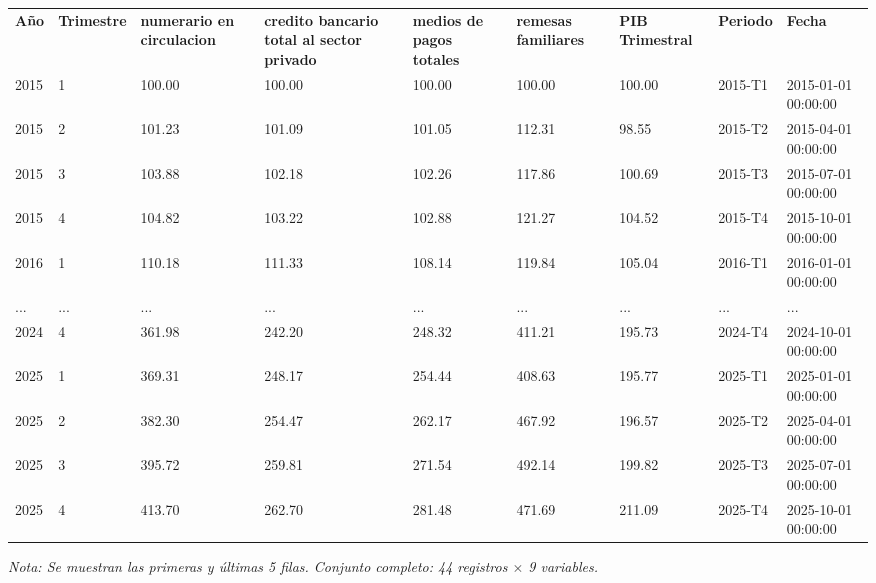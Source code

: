 

\begin{table}[htbp]

\centering

\begin{adjustbox}{max width=\textwidth}

\begin{tabular}{lllllllll}

\rowcolor{ThemeBackground}
\rule{0pt}{0.45cm}
\textcolor{ThemeGold}{\bfseries Año} & \textcolor{ThemeGold}{\bfseries Trimestre} & \textcolor{ThemeGold}{\bfseries numerario en circulacion} & \textcolor{ThemeGold}{\bfseries credito bancario total al sector privado} & \textcolor{ThemeGold}{\bfseries medios de pagos totales} & \textcolor{ThemeGold}{\bfseries remesas familiares} & \textcolor{ThemeGold}{\bfseries PIB Trimestral} & \textcolor{ThemeGold}{\bfseries Periodo} & \textcolor{ThemeGold}{\bfseries Fecha} \\

2015 & 1 & 100.00 & 100.00 & 100.00 & 100.00 & 100.00 & 2015-T1 & 2015-01-01 00:00:00 \\
2015 & 2 & 101.23 & 101.09 & 101.05 & 112.31 & 98.55 & 2015-T2 & 2015-04-01 00:00:00 \\
2015 & 3 & 103.88 & 102.18 & 102.26 & 117.86 & 100.69 & 2015-T3 & 2015-07-01 00:00:00 \\
2015 & 4 & 104.82 & 103.22 & 102.88 & 121.27 & 104.52 & 2015-T4 & 2015-10-01 00:00:00 \\
2016 & 1 & 110.18 & 111.33 & 108.14 & 119.84 & 105.04 & 2016-T1 & 2016-01-01 00:00:00 \\
... & ... & ... & ... & ... & ... & ... & ... & ... \\
2024 & 4 & 361.98 & 242.20 & 248.32 & 411.21 & 195.73 & 2024-T4 & 2024-10-01 00:00:00 \\
2025 & 1 & 369.31 & 248.17 & 254.44 & 408.63 & 195.77 & 2025-T1 & 2025-01-01 00:00:00 \\
2025 & 2 & 382.30 & 254.47 & 262.17 & 467.92 & 196.57 & 2025-T2 & 2025-04-01 00:00:00 \\
2025 & 3 & 395.72 & 259.81 & 271.54 & 492.14 & 199.82 & 2025-T3 & 2025-07-01 00:00:00 \\
2025 & 4 & 413.70 & 262.70 & 281.48 & 471.69 & 211.09 & 2025-T4 & 2025-10-01 00:00:00 \\
\bottomrule
\end{tabular}

\end{adjustbox}

\vspace{0.15cm}
{\raggedright\sffamily\footnotesize\color{ThemeMuted}
\textit{Nota: Se muestran las primeras y últimas 5 filas. Conjunto completo: 44 registros $\times$ 9 variables.}}

\end{table}

